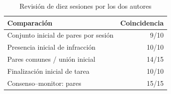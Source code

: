 \begin{table}[!t]
\caption{Revisión de diez sesiones por los dos autores}
\label{tab:human_review}\centering\footnotesize
\begin{tabular}{lr}\hline
Comparación & Coincidencia\\\hline
Conjunto inicial de pares por sesión & 9/10\\
Presencia inicial de infracción & 10/10\\
Pares comunes / unión inicial & 14/15\\
Finalización inicial de tarea & 10/10\\
Consenso--monitor: pares & 15/15\\
\hline\end{tabular}\end{table}
